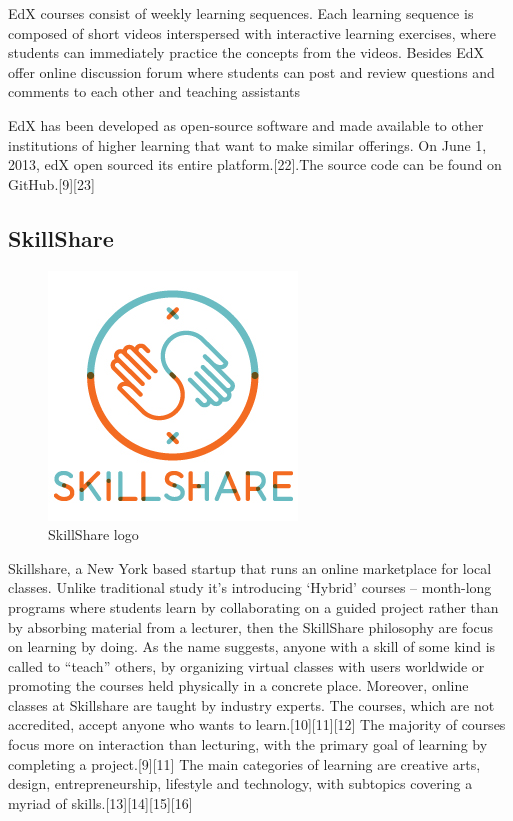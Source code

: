 EdX courses consist of weekly learning sequences. Each learning sequence is composed of short videos interspersed with interactive learning exercises, where students can immediately practice the concepts from the videos.
Besides EdX offer online discussion forum where students can post and review questions and comments to each other and teaching assistants

EdX has been developed as open-source software and made available to other institutions of higher learning that want to make similar offerings. On June 1, 2013, edX open sourced its entire platform.[22].The source code can be found on GitHub.[9][23]


\subsection{SkillShare}
\label{subsec:SkillShare}
\begin{figure}[htb] %
 \centering
 \includegraphics[width=0.5\linewidth]{images/chapter1/skillshare.jpg}\hfill
 \caption[SkillShare logo]{SkillShare logo}
 \label{fig:fourV}
\end{figure}




Skillshare, a New York based startup that runs an online marketplace for local classes.
Unlike traditional study it’s introducing ‘Hybrid’ courses – month-long programs where students learn by collaborating on a guided project rather than by absorbing material from a lecturer, then the SkillShare philosophy are focus on learning by doing.
As the name suggests, anyone with a skill of some kind is called to “teach” others, by organizing virtual classes with users worldwide or promoting the courses held physically in a concrete place.
Moreover, online classes at Skillshare are taught by industry experts. The courses, which are not accredited, accept anyone who wants to learn.[10][11][12] The majority of courses focus more on interaction than lecturing, with the primary goal of learning by completing a project.[9][11] The main categories of learning are creative arts, design, entrepreneurship, lifestyle and technology, with subtopics covering a myriad of skills.[13][14][15][16]

